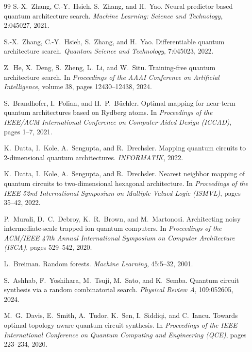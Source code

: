 \documentclass[11pt]{article}
\begin{document}
\begin{thebibliography}{99}
S.-X.~Zhang, C.-Y.~Hsieh, S.~Zhang, and H.~Yao.
\newblock Neural predictor based quantum architecture search.
\newblock \emph{Machine Learning: Science and Technology}, 2:045027, 2021.

S.-X.~Zhang, C.-Y.~Hsieh, S.~Zhang, and H.~Yao.
\newblock Differentiable quantum architecture search.
\newblock \emph{Quantum Science and Technology}, 7:045023, 2022.

Z.~He, X.~Deng, S.~Zheng, L.~Li, and W.~Situ.
\newblock Training-free quantum architecture search.
\newblock In \emph{Proceedings of the AAAI Conference on Artificial
Intelligence}, volume 38, pages 12430--12438, 2024.

S.~Brandhofer, I.~Polian, and H.~P.~Büchler.
\newblock Optimal mapping for near-term quantum architectures based on
Rydberg atoms.
\newblock In \emph{Proceedings of the IEEE/ACM International Conference on
Computer-Aided Design (ICCAD)}, pages 1--7, 2021.

K.~Datta, I.~Kole, A.~Sengupta, and R.~Drechsler.
\newblock Mapping quantum circuits to 2-dimensional quantum architectures.
\newblock \emph{INFORMATIK}, 2022.

K.~Datta, I.~Kole, A.~Sengupta, and R.~Drechsler.
\newblock Nearest neighbor mapping of quantum circuits to two-dimensional
hexagonal architecture.
\newblock In \emph{Proceedings of the IEEE 52nd International Symposium on
Multiple-Valued Logic (ISMVL)}, pages 35--42, 2022.

P.~Murali, D.~C.~Debroy, K.~R.~Brown, and M.~Martonosi.
\newblock Architecting noisy intermediate-scale trapped ion quantum
computers.
\newblock In \emph{Proceedings of the ACM/IEEE 47th Annual International
Symposium on Computer Architecture (ISCA)}, pages 529--542, 2020.

L.~Breiman.
\newblock Random forests.
\newblock \emph{Machine Learning}, 45:5--32, 2001.

S.~Ashhab, F.~Yoshihara, M.~Tsuji, M.~Sato, and K.~Semba.
\newblock Quantum circuit synthesis via a random combinatorial search.
\newblock \emph{Physical Review A}, 109:052605, 2024.

M.~G.~Davis, E.~Smith, A.~Tudor, K.~Sen, I.~Siddiqi, and C.~Iancu.
\newblock Towards optimal topology aware quantum circuit synthesis.
\newblock In \emph{Proceedings of the IEEE International Conference on
Quantum Computing and Engineering (QCE)}, pages 223--234, 2020.


\end{thebibliography}
\end{document}
